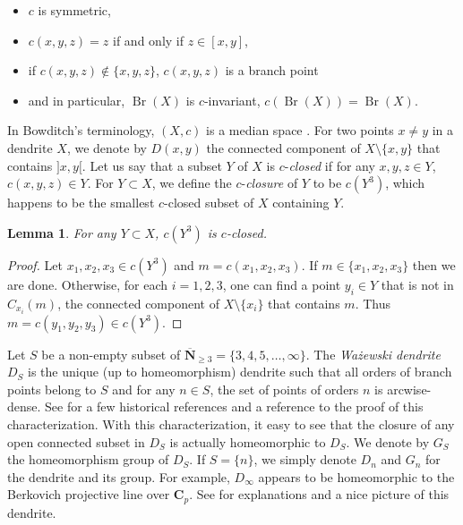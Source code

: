 \documentclass[JEP,XML,SOM,Unicode,NoFloatCountersInSection]{cedram}
\theoremstyle{plain}
\newtheorem{lem}[thm]{Lemma}
\theoremstyle{definition}
\newcommand{\CC}{\mathbf{C}}
\newcommand{\NN}{\mathbf{N}}
\DeclareMathOperator{\Br}{Br}
\begin{document}
\begin{itemize}
\item $c$ is symmetric,
\item $c(x,y,z)=z$ if and only if $z\in[x,y]$,
\item if $c(x,y,z)\notin\{x,y,z\}$, $c(x,y,z)$ is a branch point
\item and in particular, $\Br(X)$ is $c$-invariant, \ie $c(\Br(X))=\Br(X)$.
\end{itemize}
In Bowditch's terminology, $(X,c)$ is a median space \cite{BowditchAMS}. For two points $x\neq y$ in a dendrite $X$, we denote by $D(x,y)$ the connected component of $X\setminus\{x,y\}$ that contains $]x,y[$. Let us say that a subset $Y$ of $X$ is $c$-\emph{closed} if for any $x,y,z\in Y$, $c(x,y,z)\in Y$. For $Y\subset X$, we define the $c$-\emph{closure} of $Y$ to be $c(Y^3)$, which happens to be the smallest $c$-closed subset of $X$ containing $Y$.

\begin{lem} For any $Y\subset X$, $c(Y^3)$ is $c$-closed.
\end{lem}

\begin{proof} Let $x_1,x_2,x_3\in c(Y^3)$ and $m=c(x_1,x_2,x_3)$. If $m\in\{x_1,x_2,x_3\}$ then we are done. Otherwise, for each $i=1,2,3$, one can find a point $y_i\in Y$ that is not in $C_{x_i}(m)$, the connected component of $X\setminus\{x_i\}$ that contains $m$. Thus $m=c(y_1,y_2,y_3)\in c(Y^3)$.\end{proof}

Let $S$ be a non-empty subset of $\overline{\NN}_{\geq3}=\{3,4,5,\dots,\infty\}$. The \emph{Wa\.zewski dendrite}~ $D_S$ is the unique (up to homeomorphism) dendrite such that all orders of branch points belong to $S$ and for any $n\in S$, the set of points of orders $n$ is arcwise-dense. See \cite[\S12]{DM_dendrites} for a few historical references and a reference to the proof of this characterization. With this characterization, it easy to see that the closure of any open connected subset in $D_S$ is actually homeomorphic to $D_S$. We denote by $G_S$ the homeomorphism group of $D_S$. If $S=\{n\}$, we simply denote $D_n$ and $G_n$ for the dendrite and its group. For example, $D_\infty$ appears to be homeomorphic to the Berkovich projective line over $\CC_p$. See \cite[Fig.\,1] {Hrushovski-Loeser-Poonen} for explanations and a nice picture of this dendrite.
\end{document}
